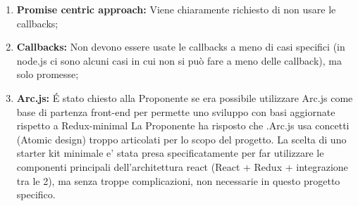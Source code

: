 \documentclass[VER-2017-11-22.tex]{subfiles}
\begin{document}
\begin{enumerate}
	\item \textbf{Promise centric approach:} Viene chiaramente richiesto di non usare le callbacks;
	\item \textbf{Callbacks:} Non devono essere usate le callbacks a meno di casi specifici (in node.js ci sono alcuni casi in cui non si può fare a meno delle callback), ma solo promesse;
	\item \textbf{Arc.js:} \'{E} stato chiesto alla Proponente se era possibile utilizzare Arc.js come base di partenza front-end per permette uno sviluppo con basi aggiornate rispetto a Redux-minimal La Proponente ha risposto che .Arc.js usa concetti (Atomic design) troppo articolati per lo scopo del progetto. La scelta di uno starter kit minimale e' stata presa specificatamente per far utilizzare le  componenti principali dell'architettura react (React + Redux + integrazione tra le 2), ma senza troppe complicazioni, non necessarie in questo progetto specifico.
\end{enumerate}
\end{document}
